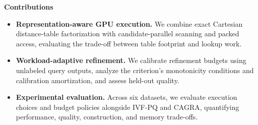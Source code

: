 \textbf{Contributions}
\begin{itemize}
    \item \textbf{Representation-aware GPU execution.} We combine exact Cartesian distance-table factorization with candidate-parallel scanning and packed access, evaluating the trade-off between table footprint and lookup work.
    \item \textbf{Workload-adaptive refinement.} We calibrate refinement budgets using unlabeled query outputs, analyze the criterion's monotonicity conditions and calibration amortization, and assess held-out quality.
    \item \textbf{Experimental evaluation.} Across six datasets, we evaluate execution choices and budget policies alongside IVF-PQ and CAGRA, quantifying performance, quality, construction, and memory trade-offs.
\end{itemize}